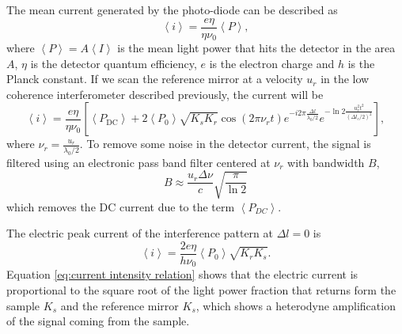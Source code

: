 \documentclass[12pt,twoside,english]{book}
\renewcommand{\~}{\perispomeni}%
\numberwithin{equation}{section}
\numberwithin{figure}{section}
\begin{document}
The mean current generated by the photo-diode can be described as
\begin{equation}
\left\langle i\right\rangle =\frac{e\eta}{\eta\nu_{0}}\left\langle P\right\rangle ,\end{equation}
where $\left\langle P\right\rangle =A\left\langle I\right\rangle $ is the mean light power that hits the detector in the area $A$, $\eta$ is the detector quantum efficiency, $e$ is the electron charge and $h$ is the Planck constant. If we scan the reference mirror at a velocity $u_{r}$ in the low coherence interferometer described previously, the current will be
\begin{equation}
\left\langle i\right\rangle =\frac{e\eta}{\eta\nu_{0}}\left[\left\langle P_{\text{DC}}\right\rangle +2\left\langle P_{0}\right\rangle \sqrt{K_{s}K_{r}}\cos\left(2\pi\nu_{r}t\right)e^{-i2\pi\frac{\Delta l}{\lambda_{0}/2}}e^{-\ln2\frac{u_{r}^{2}t^{2}}{\left(\Delta l_{c}/2\right)^{2}}}\right],\end{equation}
where $\nu_{r}=\frac{u_{r}}{\lambda_{0}/2}$. To remove some noise in the detector current, the signal is filtered using an electronic pass band filter centered at $\nu_{r}$ with bandwidth $B$,
\begin{equation}
B\approx\frac{u_{r}\Delta\nu}{c}\sqrt{\frac{\pi}{\ln2}}\end{equation}
which removes the DC current due to the term $\left\langle P_{DC}\right\rangle $. 

The electric peak current of the interference pattern at $\Delta l=0$ is
\begin{equation}
\left\langle i\right\rangle =\frac{2e\eta}{h\nu_{0}}\left\langle P_{0}\right\rangle \sqrt{K_{r}K_{s}}.\label{eq:current intensity relation}\end{equation}
Equation \ref{eq:current intensity relation} shows that the electric current is proportional to the square root of the light power fraction that returns form the sample $K_{s}$ and the reference mirror $K_{s}$, which shows a heterodyne amplification of the signal coming from the sample.
\end{document}
